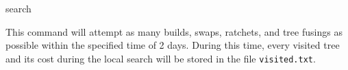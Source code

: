\begin{command}{search}{}
\begin{poyexamples}
            {This command will attempt as many builds, swaps, ratchets, and tree
            fusings as possible within the specified time of 2 days.  During this 
            time, every visited tree and its cost during the local search will
            be stored in the file \texttt{visited.txt}.}

    \end{poyexamples}

    \begin{poyalso}
    \end{poyalso}

\end{command}



   

